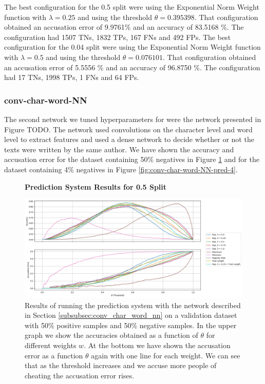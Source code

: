 The best configuration for the 0.5 split were using the Exponential Norm Weight
function with $\lambda = 0.25$ and using the threshold $\theta = 0.395398$.
That configuration obtained an accusation error of 9.9761\% and an accuracy of
83.5168 \%. The configuration had 1507 \gls{TN}s, 1832 \gls{TP}s, 167 \gls{FN}s
and 492 \gls{FP}s. The best configuration for the 0.04 split were using the
Exponential Norm Weight function with $\lambda = 0.5$ and using the threshold
$\theta = 0.076101$. That configuration obtained an accusation error of 5.5556
\% and an accuracy of 96.8750 \%. The configuration had 17 \gls{TN}s, 1998
\gls{TP}s, 1 \gls{FN}s and 64 \gls{FP}s.


\subsubsection{\glsdesc{conv-char-word-NN}}

The second network we tuned hyperparameters for were the network presented
in Figure TODO. The network used convolutions on the character level and
word level to extract features and used a dense network to decide whether or
not the texts were written by the same author. We have shown the accuracy
and accusation error for the dataset containing 50\% negatives in Figure
\ref{fig:conv-char-word-NN-pred-50} and for the dataset containing 4\%
negatives in Figure \ref{fig:conv-char-word-NN-pred-4}.

\begin{figure}
    \centering
    \textbf{Prediction System Results for 0.5 Split}\par\medskip
    \includegraphics[width=\textwidth]{./pictures/experiments/conv_char_word_nn/prediction_system_50.png}
    \caption{Results of running the prediction system with the network described
        in Section \ref{subsubsec:conv_char_word_nn} on a validation dataset
        with 50\% positive samples and 50\% negative samples. In the upper graph
        we show the accuracies obtained as a function of $\theta$ for different
        weights $w$. At the bottom we have shown the accusation error as a
        function $\theta$ again with one line for each weight. We can see that
        as the threshold increases and we accuse more people of cheating the
        accusation error rises.}
    \label{fig:conv-char-word-NN-pred-50}
\end{figure}

